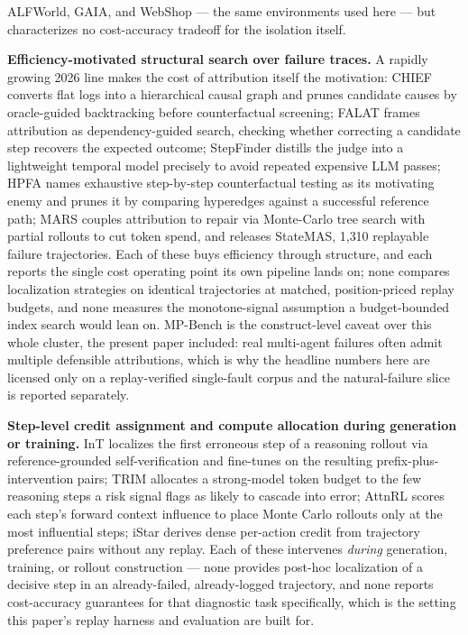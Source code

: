 \documentclass[11pt]{article}
\begin{document}
ALFWorld, GAIA, and WebShop --- the same environments used here --- but characterizes no cost-accuracy tradeoff for the isolation itself.

\textbf{Efficiency-motivated structural search over failure traces.} A rapidly growing 2026 line makes the cost of attribution itself the motivation: CHIEF \citep{CHIEF2602} converts flat logs into a hierarchical causal graph and prunes candidate causes by oracle-guided backtracking before counterfactual screening; FALAT \citep{FALAT2606} frames attribution as dependency-guided search, checking whether correcting a candidate step recovers the expected outcome; StepFinder \citep{StepFinder2606} distills the judge into a lightweight temporal model precisely to avoid repeated expensive LLM passes; HPFA \citep{HPFA2608} names exhaustive step-by-step counterfactual testing as its motivating enemy and prunes it by comparing hyperedges against a successful reference path; MARS \citep{MARS2607} couples attribution to repair via Monte-Carlo tree search with partial rollouts to cut token spend, and releases StateMAS, 1{,}310 replayable failure trajectories. Each of these buys efficiency through structure, and each reports the single cost operating point its own pipeline lands on; none compares localization strategies on identical trajectories at matched, position-priced replay budgets, and none measures the monotone-signal assumption a budget-bounded index search would lean on. MP-Bench \citep{MPBench2603} is the construct-level caveat over this whole cluster, the present paper included: real multi-agent failures often admit multiple defensible attributions, which is why the headline numbers here are licensed only on a replay-verified single-fault corpus and the natural-failure slice is reported separately.

\textbf{Step-level credit assignment and compute allocation during generation or training.} InT \citep{InT2025} localizes the first erroneous step of a reasoning rollout via reference-grounded self-verification and fine-tunes on the resulting prefix-plus-intervention pairs; TRIM \citep{TRIM2025} allocates a strong-model token budget to the few reasoning steps a risk signal flags as likely to cascade into error; AttnRL \citep{AttnRL2025} scores each step's forward context influence to place Monte Carlo rollouts only at the most influential steps; iStar \citep{iStar2025} derives dense per-action credit from trajectory preference pairs without any replay. Each of these intervenes \emph{during} generation, training, or rollout construction --- none provides post-hoc localization of a decisive step in an already-failed, already-logged trajectory, and none reports cost-accuracy guarantees for that diagnostic task specifically, which is the setting this paper's replay harness and evaluation are built for.
\end{document}
